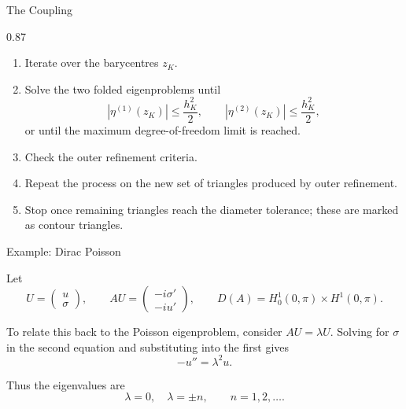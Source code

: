 \documentclass[aspectratio=169]{beamer}
\begin{document}
\begin{frame}{The Coupling}
\begin{overlayarea}{\textwidth}{0.87\textheight}

\begin{enumerate}
    \item<1-> Iterate over the barycentres $z_K$.
    \item<2-> Solve the two folded eigenproblems until
    \[
        \left|\eta^{(1)}(z_K)\right| \leq \frac{h_K^2}{2},
        \qquad
        \left|\eta^{(2)}(z_K)\right| \leq \frac{h_K^2}{2},
    \]
    or until the maximum degree-of-freedom limit is reached.
    \item<3-> Check the outer refinement criteria.
    \item<4-> Repeat the process on the new set of triangles produced by outer refinement.
    \item<5-> Stop once remaining triangles reach the diameter tolerance; these are marked as contour triangles.
\end{enumerate}

\end{overlayarea}
\end{frame}

\begin{frame}{Example: Dirac Poisson}

Let
\[
    U=\begin{pmatrix}u\\ \sigma\end{pmatrix},
    \qquad
    AU=\begin{pmatrix}-i\sigma'\\ -iu'\end{pmatrix},
    \qquad
    D(A)=H_0^1(0,\pi)\times H^1(0,\pi).
\]

\vspace{0.15cm}

To relate this back to the Poisson eigenproblem, consider $AU=\lambda U$. Solving for $\sigma$ in the second equation and substituting into the first gives
\[
    -u''=\lambda^2 u .
\]

\vspace{0.1cm}

Thus the eigenvalues are
\[
    \lambda=0,\quad \lambda=\pm n,\qquad n=1,2,\ldots .
\]

\end{frame}
\end{document}
